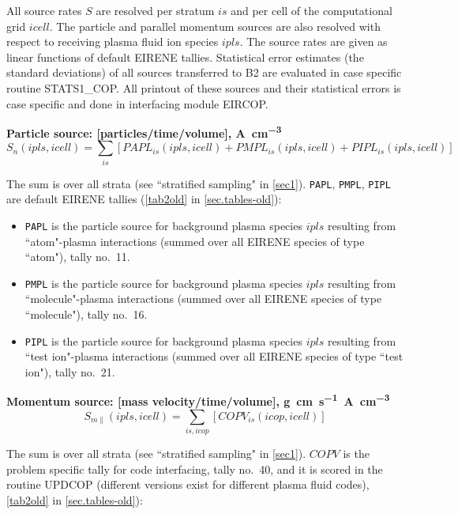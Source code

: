 All source rates $S$ are resolved per stratum $is$ and per cell of the
computational grid $icell$.
The particle and parallel momentum sources are also resolved with respect to
receiving plasma fluid ion species $ipls$.
The source rates are given as linear functions of default EIRENE tallies.
Statistical error estimates (the standard deviations) of all sources
transferred to B2 are evaluated in case specific routine STATS1\_COP.
All printout of these sources and their statistical errors is case specific and
done in interfacing module EIRCOP.

\textbf{Particle source: [particles/time/volume],
\si{\ampere\per\cubic\centi\metre}}
\begin{equation}
  S_n(ipls,icell) =
  \sum_{is} \left[PAPL_{is}(ipls,icell) + PMPL_{is}(ipls,icell) +
    PIPL_{is}(ipls,icell) \right]
\end{equation}

The sum is over all strata (see  ``stratified sampling" in \cref{sec1}).
\lstinline|PAPL|, \lstinline|PMPL|,  \lstinline|PIPL| are
default EIRENE tallies (\cref{tab2old} in \cref{sec.tables-old}):
\begin{itemize}
  \item \lstinline|PAPL| is the particle source for background plasma
        species $ipls$ resulting from ``at\-om"-plasma interactions (summed over all
        EIRENE species of type ``atom"), tally no.\ 11.
  \item \lstinline|PMPL| is the particle source for background plasma
        species $ipls$ resulting from ``mol\-e\-cule"-plasma interactions (summed over
        all EIRENE species of type ``molecule"), tally no.\ 16.
  \item \lstinline|PIPL| is the particle source for background plasma
        species $ipls$ resulting from ``test ion"-plasma interactions (summed over all
        EIRENE species of type ``test ion"), tally no.\ 21.
\end{itemize}
\textbf{Momentum source: [mass velocity/time/volume],
\si{\gram\centi\metre\per\second\ampere\per\cubic\centi\metre}}
\begin{equation}
  \label{Sm} S_{m\parallel}(ipls,icell) = \sum_{is,icop}
  \left[COPV_{is}(icop,icell) \right]
\end{equation}

The sum is over all strata (see  ``stratified sampling" in \cref{sec1}).
$COPV$ is the problem specific tally for code interfacing, tally no.\ 40, and
it is scored in the routine UPDCOP (different versions exist for different
plasma fluid codes), \cref{tab2old} in \cref{sec.tables-old}):

